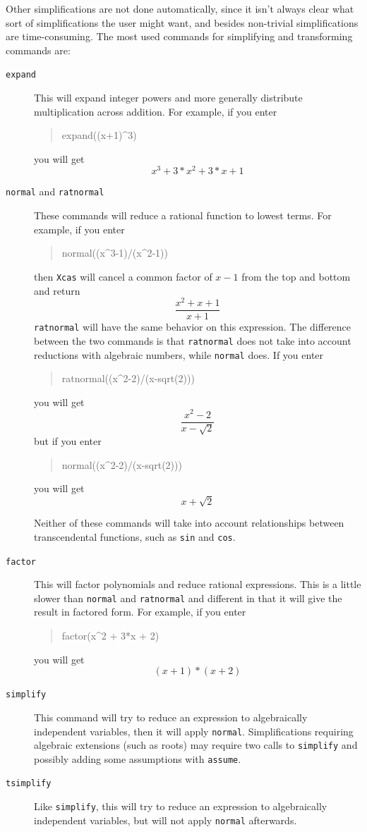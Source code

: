 \documentclass{article}
\newcommand{\xcasin}[1]
{\begin{quote}\ttfamily
#1
\end{quote}}
\newcommand{\xcasout}[1]
{\begin{equation*}
#1
\end{equation*}}
\begin{document}
Other simplifications are not done automatically, since it isn't
always clear what sort of simplifications the user might want, and
besides non-trivial simplifications are time-consuming.
The most used commands for simplifying and transforming commands are:
\begin{description}
  \item[\texttt{expand}]
  This will expand integer powers and more generally distribute
  multiplication across addition.  For example, if you enter
  \xcasin{expand((x+1)\^{}3)}
  you will get
  \xcasout{x^3 + 3*x^2 + 3*x + 1}
  
  \item[\texttt{normal} and \texttt{ratnormal}]
  These commands will reduce a rational function to lowest terms.  For
  example, if you enter
  \xcasin{normal((x\^{}3-1)/(x\^{}2-1))}
  then \texttt{Xcas} will cancel a common factor of $x-1$ from the top
  and bottom and return
  \xcasout{\frac{x^2+x+1}{x+1}}
  \texttt{ratnormal} will have the same behavior on this expression.
  The difference between the two commands is that \texttt{ratnormal}
  does not take into account reductions with algebraic numbers, while
  \texttt{normal} does.  If you enter
  \xcasin{ratnormal((x\^{}2-2)/(x-sqrt(2)))}
  you will get
  \xcasout{\frac{x^2-2}{x-\sqrt{2}}}
  but if you enter
  \xcasin{normal((x\^{}2-2)/(x-sqrt(2)))}
  you will get
  \xcasout{x+\sqrt{2}}
  
  Neither of these commands will take into account relationships
  between transcendental functions, such as \texttt{sin} and \texttt{cos}.
    
  \item[\texttt{factor}]
  This will factor polynomials and reduce rational expressions.  This
  is a little slower than \texttt{normal} and \texttt{ratnormal} and
  different in that it will give the result in factored form.  For
  example, if you enter  
  \xcasin{factor(x\^{}2 + 3*x + 2)}
  you will get
  \xcasout{(x + 1)*(x + 2)}

  \item[\texttt{simplify}]
  This command will try to reduce an expression to algebraically
  independent variables, then it will apply \texttt{normal}.
  Simplifications requiring algebraic extensions (such as roots) may
  require two calls to \texttt{simplify} and possibly adding some
  assumptions with \texttt{assume}.  
  
  \item[\texttt{tsimplify}]
  Like \texttt{simplify}, this will try to reduce an expression to
  algebraically independent variables, but will not apply
  \texttt{normal} afterwards.
\end{description}  
\end{document}
